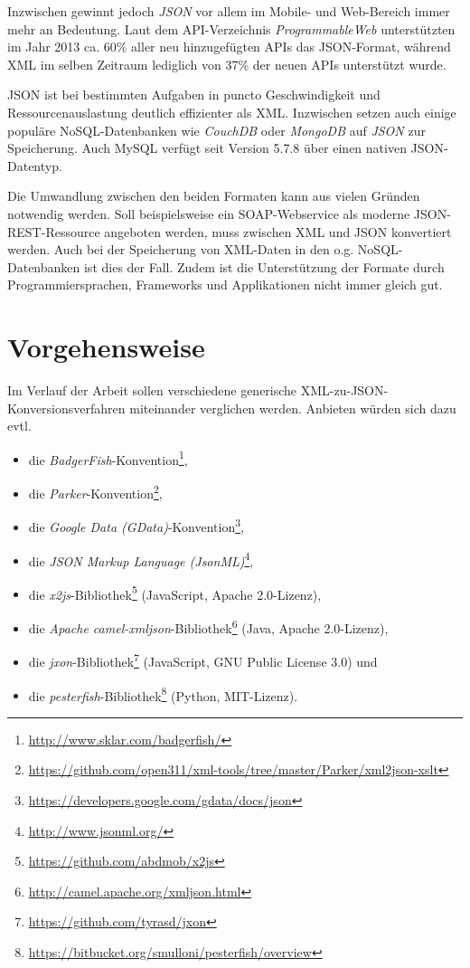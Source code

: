 \documentclass[conference]{template/IEEEtran}
\begin{document}
Inzwischen gewinnt jedoch \emph{JSON} vor allem im Mobile-
und Web-Bereich immer mehr an Bedeutung. Laut dem API-Verzeichnis
\emph{ProgrammableWeb} unterstützten im Jahr 2013 ca. 60\% aller neu
hinzugefügten APIs das JSON-Format, während XML im selben Zeitraum lediglich
von 37\% der neuen APIs unterstützt wurde.\cite{duvander2013convergence}

JSON ist bei bestimmten Aufgaben in puncto Geschwindigkeit und
Ressourcenauslastung deutlich effizienter\cite{nurseitov2009comparison} als
XML\@. Inzwischen setzen auch einige populäre NoSQL-Datenbanken wie
\emph{CouchDB} oder \emph{MongoDB} auf \emph{JSON} zur Speicherung. Auch
MySQL verfügt seit Version 5.7.8 über einen nativen JSON-Datentyp.

Die Umwandlung zwischen den beiden Formaten kann aus vielen Gründen
notwendig werden. Soll beispielsweise ein SOAP-Webservice als moderne
JSON-REST-Ressource angeboten werden, muss zwischen XML und JSON konvertiert
werden. Auch bei der Speicherung von XML-Daten in den o.g. NoSQL-Datenbanken
ist dies der Fall. Zudem ist die Unterstützung der Formate durch
Programmiersprachen, Frameworks und Applikationen nicht immer gleich gut.

\section{Vorgehensweise}
\label{sec:workingmethod}
Im Verlauf der Arbeit sollen verschiedene generische
XML-zu-JSON-Konversionsverfahren miteinander verglichen werden. Anbieten würden
sich dazu evtl.

\begin{itemize}
    \item die \emph{BadgerFish}-Konvention\footnote{\url{http://www.sklar.com/badgerfish/}},
    \item die \emph{Parker}-Konvention\footnote{\url{https://github.com/open311/xml-tools/tree/master/Parker/xml2json-xslt}},
    \item die \emph{Google Data (GData)}-Konvention\footnote{\url{https://developers.google.com/gdata/docs/json}},
    \item die \emph{JSON Markup Language (JsonML)}\footnote{\url{http://www.jsonml.org/}},
    \item die \emph{x2js}-Bibliothek\footnote{\url{https://github.com/abdmob/x2js}} (JavaScript, Apache 2.0-Lizenz),
    \item die \emph{Apache camel-xmljson}-Bibliothek\footnote{\url{http://camel.apache.org/xmljson.html}} (Java, Apache 2.0-Lizenz),
    \item die \emph{jxon}-Bibliothek\footnote{\url{https://github.com/tyrasd/jxon}} (JavaScript, GNU Public License 3.0) und
    \item die \emph{pesterfish}-Bibliothek\footnote{\url{https://bitbucket.org/smulloni/pesterfish/overview}} (Python, MIT-Lizenz).
\end{itemize}
\end{document}
